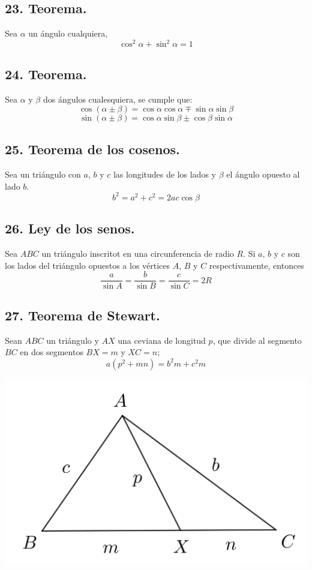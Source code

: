 \documentclass[12pt,a4paper]{article}
\begin{document}
\subsection*{23. Teorema.}
Sea $\alpha$ un ángulo cualquiera,$$\cos^ 2 \alpha + \sin ^2 \alpha =1$$
\subsection*{24. Teorema.}
Sea $\alpha$ y $\beta$ dos ángulos cualesquiera, se cumple que:$$\cos ( \alpha \pm \beta) = \cos \alpha \cos \alpha \mp \sin \alpha \sin \beta$$
$$\sin (\alpha \pm \beta) = \cos \alpha \sin \beta \pm \cos \beta \sin \alpha$$
\subsection*{25. Teorema de los cosenos.}
Sea un triángulo con $a$, $b$ y $c$ las longitudes de los lados y $\beta$ el ángulo opuesto al lado $b$.
$$b^2 = a^2 + c^2 =2ac \cos \beta$$
\subsection*{26. Ley de los senos.}
Sea $ABC$ un triángulo inscritot en una circunferencia de radio $R$. Si $a$, $b$ y $c$ son los lados del triángulo opuestos a los vértices $A$, $B$ y $C$ respectivamente, entonces$$ \dfrac{a}{\sin A} = \dfrac{b}{\sin B}= \dfrac{c}{\sin C}= 2R$$
\subsection*{27. Teorema de Stewart.}
Sean $ABC$ un triángulo y $AX$ una ceviana de longitud $p$, que divide al segmento $BC$ en dos segmentos $BX=m$ y $XC=n$; $$a(p^2 +mn) = b^2m + c^2m$$
\begin{center}
\includegraphics[scale=0.6]{stewart.png} 
\end{center}
\end{document}

